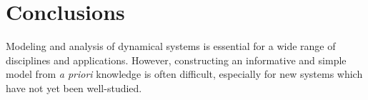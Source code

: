
\chapter{Conclusions \label{ch:conclusion}}

Modeling and analysis of dynamical systems is essential for a wide range of disciplines and applications. 
%
However, constructing an informative and simple model from {\em a priori} knowledge is often difficult, especially for new systems which have not yet been well-studied. 
%

